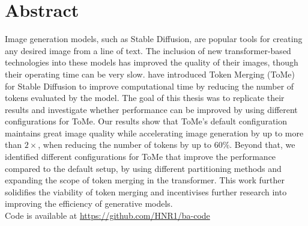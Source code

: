 \section*{Abstract}
Image generation models, such as Stable Diffusion, are popular tools for creating any desired image from a line of text. 
The inclusion of new transformer-based technologies into these models has improved the quality of their images, though their operating time can be very slow.
\cite{bolya2023tomesd} have introduced Token Merging (ToMe) for Stable Diffusion to improve computational time by reducing the number of tokens evaluated by the model.
The goal of this thesis was to replicate their results and investigate whether performance can be improved by using different configurations for ToMe.
Our results show that ToMe's default configuration maintains great image quality while accelerating image generation by up to more than $2 \times$, when reducing the number of tokens by up to \(60\%\). Beyond that, we identified different configurations for ToMe that improve the performance compared to the default setup, by using different partitioning methods and expanding the scope of token merging in the transformer. 
This work further solidifies the viability of token merging and incentivises further research into improving the efficiency of generative models.\\
Code is available at \url{https://github.com/HNR1/ba-code}
